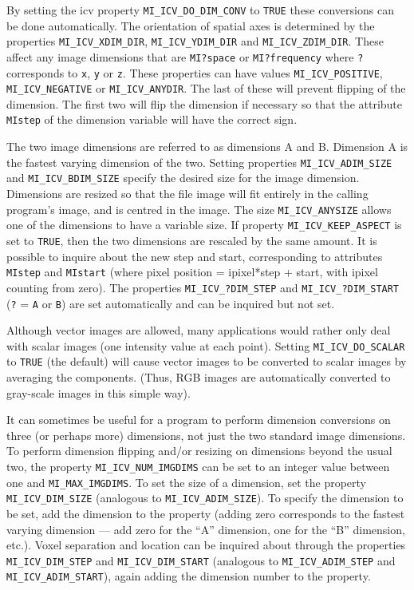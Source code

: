 By setting the icv property \verb+MI_ICV_DO_DIM_CONV+ to \verb+TRUE+
these conversions can be done automatically. The orientation of
spatial axes is determined by the properties \verb+MI_ICV_XDIM_DIR+,
\verb+MI_ICV_YDIM_DIR+ and \verb+MI_ICV_ZDIM_DIR+. These affect any
image dimensions that are \verb+MI?space+ or \verb+MI?frequency+ where
\verb+?+ corresponds to \verb+x+, \verb+y+ or \verb+z+. These
properties can have values \verb+MI_ICV_POSITIVE+,
\verb+MI_ICV_NEGATIVE+ or \verb+MI_ICV_ANYDIR+. The last of these will
prevent flipping of the dimension. The first two will flip the
dimension if necessary so that the attribute \verb+MIstep+ of the
dimension variable will have the correct sign.

The two image dimensions are referred to as dimensions A and B.
Dimension A is the fastest varying dimension of the two. Setting
properties \verb+MI_ICV_ADIM_SIZE+ and \verb+MI_ICV_BDIM_SIZE+ specify
the desired size for the image dimension. Dimensions are resized so
that the file image will fit entirely in the calling program's image,
and is centred in the image. The size \verb+MI_ICV_ANYSIZE+ allows
one of the dimensions to have a variable size. If property
\verb+MI_ICV_KEEP_ASPECT+ is set to \verb+TRUE+, then the two
dimensions are rescaled by the same amount. It is possible to inquire
about the new step and start, corresponding to attributes
\verb+MIstep+ and \verb+MIstart+ (where pixel position = ipixel*step +
start, with ipixel counting from zero). The properties
\verb+MI_ICV_?DIM_STEP+ and \verb+MI_ICV_?DIM_START+ (\verb+?+ =
\verb+A+ or \verb+B+) are set automatically and can be inquired but
not set.

Although vector images are allowed, many applications would rather
only deal with scalar images (one intensity value at each point).
Setting \verb+MI_ICV_DO_SCALAR+ to \verb+TRUE+ (the default) will
cause vector images to be converted to scalar images by averaging the
components.  (Thus, RGB images are automatically converted to
gray-scale images in this simple way).

It can sometimes be useful for a program to perform dimension
conversions on three (or perhaps more) dimensions, not just the two
standard image dimensions. To perform dimension flipping and/or
resizing on dimensions beyond the usual two, the property
\verb+MI_ICV_NUM_IMGDIMS+ can be set to an integer value between
one and \verb+MI_MAX_IMGDIMS+. To set the size of a dimension,
set the property \verb+MI_ICV_DIM_SIZE+ (analogous to
\verb+MI_ICV_ADIM_SIZE+). To specify the dimension to be set, add
the dimension to the property (adding zero corresponds to the fastest
varying dimension --- add zero for the ``A'' dimension, one for the
``B'' dimension, etc.). Voxel separation and
location can be inquired about through the properties
\verb+MI_ICV_DIM_STEP+ and \verb+MI_ICV_DIM_START+ (analogous to
\verb+MI_ICV_ADIM_STEP+ and \verb+MI_ICV_ADIM_START+), again
adding the dimension number to the property.

